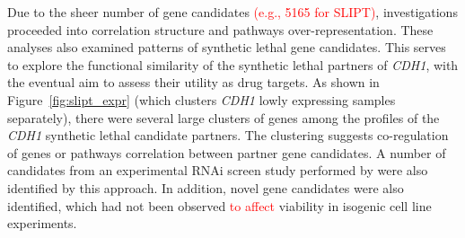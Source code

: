 Due to the sheer number of gene candidates \textcolor{red}{(e.g., 5165 for SLIPT)}, investigations proceeded into correlation structure and \glspl{pathway} over-represent\-ation. These analyses also examined  patterns of \gls{synthetic lethal} gene candidates. This serves to explore the functional similarity of the \gls{synthetic lethal} partners of \textit{CDH1}, with the eventual aim to assess their utility as drug targets. As shown in Figure~\ref{fig:slipt_expr} (which clusters \textit{CDH1} lowly expressing samples separately), there were several large clusters of genes among the   profiles of the \textit{CDH1} \gls{synthetic lethal} candidate partners. The clustering suggests co-regulation of genes or \glspl{pathway} correlation between partner gene candidates. A number of candidates from an experimental \gls{RNAi} screen study performed by \citet{Telford2015} were also identified by this approach. In addition, novel gene candidates were also identified, which had not been observed \textcolor{red}{to affect} viability in isogenic cell line experiments. %

